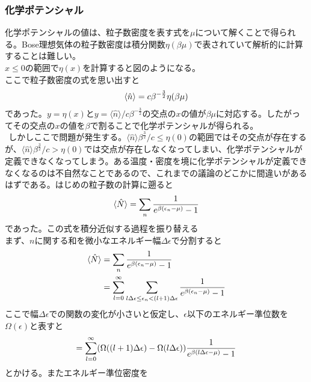 \documentclass{jsarticle}  %
\numberwithin{equation}{section} %
\numberwithin{figure}{section}
\begin{document}
\subsubsection{化学ポテンシャル}
    化学ポテンシャルの値は、粒子数密度を表す式を$\mu$について解くことで得られる。Bose理想気体の粒子数密度は積分関数$\eta (\beta \mu)$で表されていて解析的に計算することは難しい。\\
    $x \le 0$の範囲で$\eta (x)$を計算すると図のようになる。\\ここで粒子数密度の式を思い出すと
    \begin{align}
        \langle \hat{n} \rangle = c \beta^{-\frac{3}{2}} \eta (\beta \mu) \notag 
    \end{align}
    であった。$y = \eta (x)$と$y = \langle \hat{n} \rangle / c \beta^{-\frac{3}{2}} $の交点の$x$の値が$\beta \mu$に対応する。したがってその交点の$x$の値を$\beta$で割ることで化学ポテンシャルが得られる。\\
    $\ \ $しかしここで問題が発生する。$\langle \hat{n} \rangle \beta^{\frac{3}{2}} / c\le \eta (0)$の範囲ではその交点が存在するが、$\langle \hat{n} \rangle \beta^{\frac{3}{2}}  / c  > \eta (0)$では交点が存在しなくなってしまい、化学ポテンシャルが定義できなくなってしまう。ある温度・密度を境に化学ポテンシャルが定義できなくなるのは不自然なことであるので、これまでの議論のどこかに間違いがあるはずである。はじめの粒子数の計算に遡ると
    \begin{align}
        \langle \hat{N} \rangle = \sum_n \frac{1}{e^{\beta (\epsilon_n - \mu)} - 1} \notag 
    \end{align}
    であった。この式を積分近似する過程を振り替える\\
    まず、$n$に関する和を微小なエネルギー幅$\Delta \epsilon$で分割すると
    \begin{align}
        \langle \hat{N} \rangle &= \sum_n \frac{1}{e^{\beta (\epsilon_n - \mu)} - 1} \notag \\
        &= \sum_{l=0}^{\infty} \sum_{l\Delta \epsilon \le \epsilon_n < (l+1)\Delta \epsilon} \frac{1}{e^{\beta (\epsilon_n - \mu)} - 1} \notag 
    \end{align}
    ここで幅$\Delta \epsilon$での関数の変化が小さいと仮定し、$\epsilon$以下のエネルギー準位数を$\Omega(\epsilon)$と表すと
    \begin{align}
        = \sum_{l=0}^{\infty} (\Omega((l+1)\Delta \epsilon) - \Omega(l \Delta \epsilon)) \frac{1}{e^{\beta (l\Delta \epsilon - \mu)} - 1} \notag 
    \end{align}
    とかける。またエネルギー準位密度を
\end{document}
